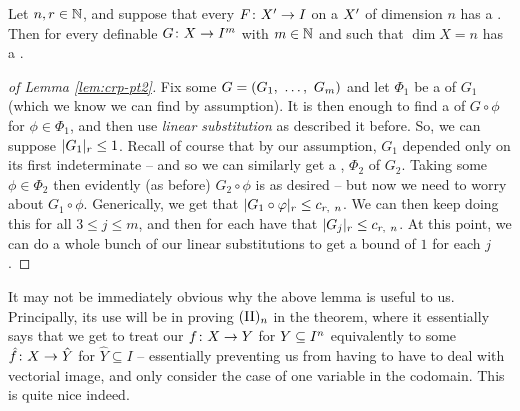 \begin{lemma}
  Let $n, r \in \N$, and suppose that every $\funcdom{F}{\pri{X}}{I}$  on a  $\pri{X}$ of dimension $n$ has a \cellrparam. Then for every definable $\funcdom{G}{X}{I^m}$ with $m \in \N$ and such that $\dim{X} = n$ has a \cellrparam.
  \label{lem:crp-pt2}
\end{lemma}

\begin{proof}[of Lemma \ref{lem:crp-pt2}]
  Fix some $G = (\vonevm{G}{m})$ and let $\Phi_1$ be a \cellrparam of $G_1$ (which we know we can find by assumption). It is then enough to find a \cellrparam of $G \circ \phi$ for $\phi \in \Phi_1$, and then use \emph{linear substitution} as described it before. So, we can suppose $\rnorm{G_1} \leq 1$. Recall of course that by our assumption, $G_1$ depended only on its first indeterminate -- and so we can similarly get a \cellrparam, $\Phi_2$ of $G_2$. Taking some $\phi \in \Phi_2$ then evidently (as before) $G_2 \circ \phi$ is as desired -- but now we need to worry about $G_1 \circ \phi$. Generically, we get that $\rnorm{G_1 \circ \phi} \leq c_{r, \ n}$. We can then keep doing this for all $3 \leq j \leq m$, and then for each have that $\rnorm{G_j} \leq c_{r, \ n}$. At this point, we can do a whole bunch of our linear substitutions to get a bound of $1$ for each $j$.
\end{proof}

\begin{remark}
  It may not be immediately obvious why the above lemma is useful to us. Principally, its use will be in proving $\IIn$ in the theorem, where it essentially says that we get to treat our $\funcdom{f}{X}{Y}$ for $\CIn[Y]{n}$ equivalently to some $\funcdom{\hat{f}}{X}{\hat{Y}}$ for $\hat{Y} \subseteq I$ -- essentially preventing us from having to have to deal with vectorial image, and only consider the case of one variable in the codomain. This is quite nice indeed.
\end{remark}

